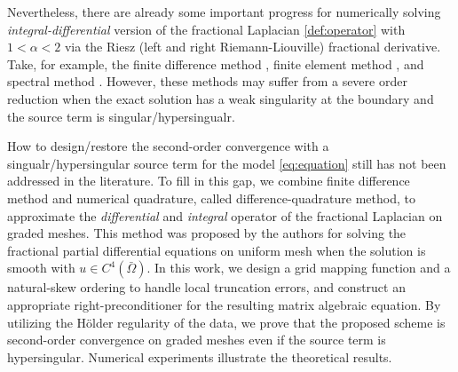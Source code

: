 \documentclass{amsart}
\theoremstyle{definition}
\theoremstyle{remark}
\numberwithin{equation}{section}
\begin{document}
Nevertheless, there are already some important progress for numerically solving {\em integral-differential} version of the   fractional Laplacian  \eqref{def:operator} with $1<\alpha<2$   via the Riesz (left and right Riemann-Liouville) fractional  derivative. Take, for example,  the finite difference method \cite{C-N:12, DLIV:19, SLYL:21, SLAT:08, YLT:10, ChenHighOdr:15, ChenSecondOdr:14, ChenFourth:14, Sousa:15, Tian:15, ZLLBTA:14}, finite element method \cite{BTY:16, Ervin:18, Deng:08}, and spectral method \cite{Chen:14, DZZ:19, WMHK:19}. 
However, these methods may suffer from a severe order reduction when the exact  solution has a weak singularity at the boundary and the source term is singular/hypersingualr. 


How to design/restore the second-order convergence with a singualr/hypersingular source term for the model \eqref{eq:equation} still has not been addressed in the literature. 
To fill in this gap, we combine  finite difference method and  numerical quadrature, called  difference-quadrature method,    to approximate  the  {\em differential} and    {\em integral}   operator of  the   fractional Laplacian  on graded meshes. This method was proposed by the authors for solving the fractional partial differential equations on uniform mesh \cite{ChenSecondOdr:14,Chen:14} when the solution is smooth with $u\in C^4(\bar{\Omega})$. In this work, we  design a grid mapping function and a natural-skew  ordering  to handle  local truncation errors, and construct an appropriate  right-preconditioner for the resulting matrix algebraic equation. By utilizing the H\"older regularity of the data, we prove that the proposed scheme  is  second-order convergence on graded meshes even if the source term is hypersingular. Numerical experiments illustrate the theoretical results.




\end{document}
